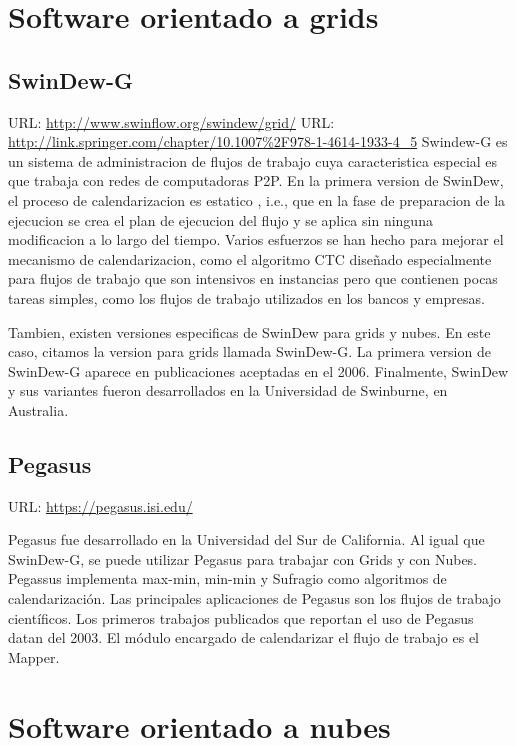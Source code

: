 \section{Software orientado a grids}

\subsection{SwinDew-G}
URL: \url{http://www.swinflow.org/swindew/grid/}
URL: \url{http://link.springer.com/chapter/10.1007%2F978-1-4614-1933-4_5}
Swindew-G es un sistema de administracion de flujos de trabajo cuya caracteristica especial es que trabaja con redes de computadoras P2P. En la primera version de SwinDew, el proceso de calendarizacion es estatico \cite{yang2007peer}, i.e., que en la fase de preparacion de la ejecucion se crea el plan de ejecucion del flujo y se aplica sin ninguna modificacion a lo largo del tiempo. Varios esfuerzos se han hecho para mejorar el mecanismo de calendarizacion, como el algoritmo CTC \cite{liu2010compromised} diseñado especialmente para flujos de trabajo que son intensivos en instancias pero que contienen pocas tareas simples, como los flujos de trabajo utilizados en los bancos y empresas.

Tambien, existen versiones especificas de SwinDew para grids y nubes. En este caso, citamos la version para grids llamada SwinDew-G. La primera version de SwinDew-G aparece en publicaciones aceptadas en el 2006. Finalmente, SwinDew y sus variantes fueron desarrollados en la Universidad de Swinburne, en Australia.

\subsection{Pegasus}
URL: \url{https://pegasus.isi.edu/}

Pegasus fue desarrollado en la Universidad del Sur de California. Al igual que SwinDew-G, se puede utilizar Pegasus para trabajar con Grids y con Nubes. Pegassus implementa max-min, min-min y Sufragio como algoritmos de calendarización. Las principales aplicaciones de Pegasus son los flujos de trabajo científicos. Los primeros trabajos publicados que reportan el uso de Pegasus datan del 2003. El módulo encargado de calendarizar el flujo de trabajo es el Mapper.

\section{Software orientado a nubes}

